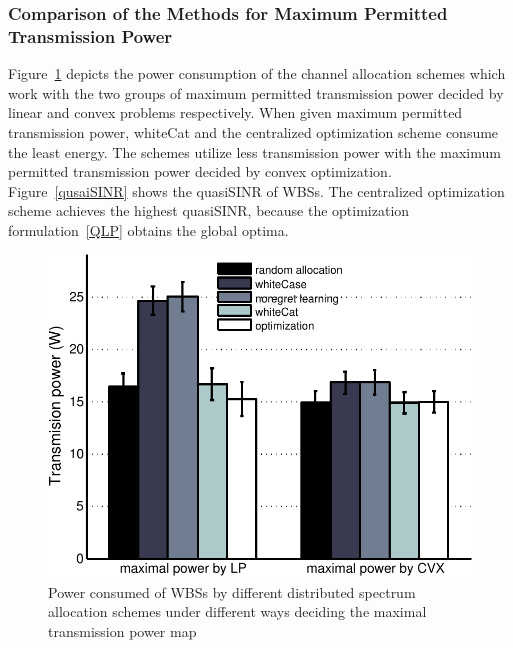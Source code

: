 \documentclass[times]{ettauth}
\theoremstyle{mytheoremstyle}
\theoremstyle{mytheoremstyle}
\theoremstyle{mytheoremstyle}
\begin{document}

\subsubsection*{Comparison of the Methods for Maximum Permitted Transmission Power}
 
Figure~\ref{transPower} depicts the power consumption of the channel allocation schemes which work with the two groups of maximum permitted transmission power decided by linear and convex problems respectively.
When given maximum permitted transmission power, whiteCat and the centralized optimization scheme consume the least energy.
The schemes utilize less transmission power with the maximum permitted transmission power decided by convex optimization.
%
Figure~\ref{qusaiSINR} shows the quasiSINR of WBSs.
The centralized optimization scheme achieves the highest quasiSINR, because the optimization formulation~\ref{QLP} obtains the global optima.
 \begin{figure}[h!]
    \centering
      \includegraphics[width=0.7\linewidth]{transPower.pdf}
    \caption{Power consumed of WBSs by different distributed spectrum allocation schemes under different ways deciding the maximal transmission power map}
\label{transPower}    
  \end{figure}
  
\end{document}
